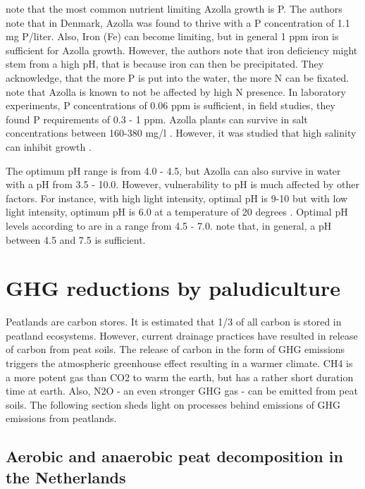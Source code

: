 {\citet{lumpkin1980azolla} note that the most common nutrient limiting Azolla growth is P. The authors note that in Denmark, Azolla was found to thrive with a P concentration of 1.1 mg P/liter. Also, Iron (Fe) can become limiting, but in general 1 ppm iron is  sufficient for Azolla growth. However, the authors note that iron deficiency might stem from a high pH, that is because iron can then be precipitated. They acknowledge, that the more P is put into the water, the more N can be fixated. \citet{sabetraftar2013review} note that Azolla is known to not be affected by high N presence. In laboratory experiments, P concentrations of 0.06 ppm is sufficient, in field studies, they found P requirements of 0.3 - 1 ppm. Azolla plants can survive in salt concentrations between 160-380 mg/l  \citep{lumpkin1980azolla}. However, it was studied that high salinity can inhibit growth \citep{sabetraftar2013review, lumpkin1980azolla}. 

The optimum pH range is from 4.0 - 4.5, but Azolla can also survive in water with a pH from 3.5 - 10.0. However, vulnerability to pH is much affected by other factors. For instance, with high light intensity, optimal pH is 9-10 but with low light intensity, optimum pH is 6.0 at a temperature of 20 degrees \citep{wagner1997azolla}. Optimal pH levels according to \citet{lumpkin1980azolla} are in a range from 4.5 - 7.0. \citet{sabetraftar2013review} note that, in general, a pH between 4.5 and 7.5 is sufficient.



\chapter{GHG reductions by paludiculture}

Peatlands are carbon stores. It is estimated that 1/3 of all carbon is stored in peatland ecosystems. However, current drainage practices have resulted in release of carbon from peat soils. The release of carbon in the form of GHG emissions triggers the atmospheric greenhouse effect resulting in a warmer climate. CH4 is a more potent gas than CO2 to warm the earth, but has a rather short duration time at earth. Also, N2O - an even stronger GHG gas - can be emitted from peat soils. The following section sheds light on processes behind emissions of GHG emissions from peatlands.

\section{Aerobic and anaerobic peat decomposition in the Netherlands}

}
